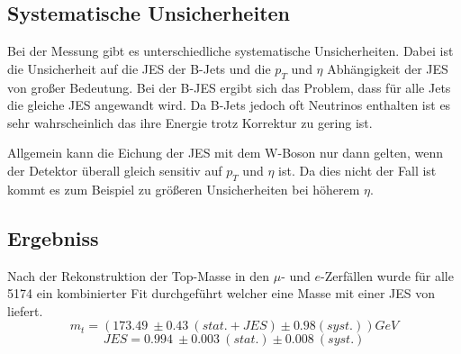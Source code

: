 \documentclass[a4paper]{article}
\begin{document}
\subsection{Systematische Unsicherheiten}
Bei der Messung gibt es unterschiedliche systematische Unsicherheiten. Dabei ist die Unsicherheit auf die JES der B-Jets und die $p_T$ und $\eta$ Abhängigkeit der JES von großer Bedeutung. Bei der B-JES ergibt sich das Problem, dass für alle Jets die gleiche JES angewandt wird. Da B-Jets jedoch oft Neutrinos enthalten ist es sehr wahrscheinlich das ihre Energie trotz Korrektur zu gering ist. 

Allgemein kann die Eichung der JES mit dem W-Boson nur dann gelten, wenn der Detektor überall gleich sensitiv auf $p_T$ und $\eta$ ist. Da dies nicht der Fall ist kommt es zum Beispiel zu größeren Unsicherheiten bei höherem $\eta$.

\subsection{Ergebniss}
Nach der Rekonstruktion der Top-Masse in den $\mu$- und $e$-Zerfällen wurde für alle 5174 ein kombinierter Fit durchgeführt welcher eine Masse mit einer JES von liefert.
\begin{equation}
  m_t = (\SI{173.49}{} \pm \SI{0.43}{} (stat.+JES) \pm \SI{0.98} (syst.)){GeV}
\end{equation}
\begin{equation}
  JES = \SI{0.994}{} \pm \SI{0.003}{} (stat.) \pm \SI{0.008}{} (syst.)
\end{equation}























%
%
\end{document}
